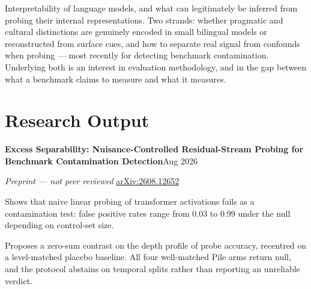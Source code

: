 {\bodysize
Interpretability of language models, and what can legitimately be inferred from probing their internal representations. Two strands: whether pragmatic and cultural distinctions are genuinely encoded in small bilingual models or reconstructed from surface cues, and how to separate real signal from confounds when probing --- most recently for detecting benchmark contamination. Underlying both is an interest in evaluation methodology, and in the gap between what a benchmark claims to measure and what it measures.
}

\section{Research Output}

{\bodysize\textbf{Excess Separability: Nuisance-Controlled Residual-Stream Probing for Benchmark Contamination Detection}\hfill{\smallsize\color{subtle}Aug 2026}}\par
\vspace{1pt}
{\bodysize\color{subtle}\textit{Preprint --- not peer reviewed} \quad\href{https://arxiv.org/abs/2608.12652}{\smallsize arXiv:2608.12652}}\par
\vspace{2pt}
\begin{bullets}
    \item Shows that naive linear probing of transformer activations fails as a contamination test: false positive rates range from 0.03 to 0.99 under the null depending on control-set size.
    \item Proposes a zero-sum contrast on the depth profile of probe accuracy, recentred on a level-matched placebo baseline. All four well-matched Pile arms return null, and the protocol abstains on temporal splits rather than reporting an unreliable verdict.
\end{bullets}

